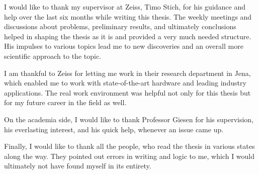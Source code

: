 
{
\null\vspace{\fill}
{}

I would like to thank my supervisor at Zeiss, Timo Stich, for his guidance and help over the last six months while writing this thesis. The weekly meetings and discussions about problems, preliminary results, and ultimately conclusions helped in shaping the thesis as it is and provided a very much needed structure. His impulses to various topics lead me to new discoveries and an overall more scientific approach to the topic.

I am thankful to Zeiss for letting me work in their research department in Jena, which enabled me to work with state-of-the-art hardware and leading industry applications. The real work environment was helpful not only for this thesis but for my future career in the field as well.

On the academia side, I would like to thank Professor Giesen for his supervision, his everlasting interest, and his quick help, whenever an issue came up. 

Finally, I would like to thank all the people, who read the thesis in various states along the way. They pointed out errors in writing and logic to me, which I would ultimately not have found myself in its entirety.

\vspace{\fill}
\newpage\thispagestyle{empty}\ \newpage
}